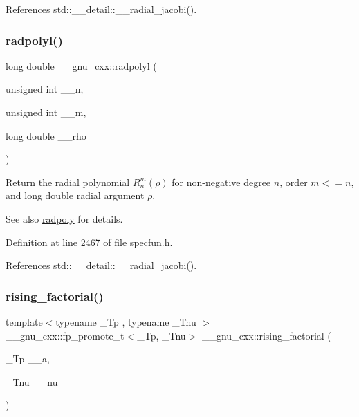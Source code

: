 References std\+::\+\_\+\+\_\+detail\+::\+\_\+\+\_\+radial\+\_\+jacobi().

\mbox{\label{group__gnu__math__spec__func_ga377febebd1096400897170bb7a76cd3a}} 
\subsubsection{\texorpdfstring{radpolyl()}{radpolyl()}}
{\footnotesize\ttfamily long double \+\_\+\+\_\+gnu\+\_\+cxx\+::radpolyl (\begin{DoxyParamCaption}\item[{unsigned int}]{\+\_\+\+\_\+n,  }\item[{unsigned int}]{\+\_\+\+\_\+m,  }\item[{long double}]{\+\_\+\+\_\+rho }\end{DoxyParamCaption})\hspace{0.3cm}{\ttfamily [inline]}}

Return the radial polynomial $ R_n^m(\rho) $ for non-\/negative degree $ n $, order $ m <= n $, and {\ttfamily long double} radial argument $ \rho $.

\begin{DoxySeeAlso}{See also}
\hyperlink{group__gnu__math__spec__func_ga195db2592888b7a8df870d9eaeff8d05}{radpoly} for details. 
\end{DoxySeeAlso}


Definition at line 2467 of file specfun.\+h.



References std\+::\+\_\+\+\_\+detail\+::\+\_\+\+\_\+radial\+\_\+jacobi().

\mbox{\label{group__gnu__math__spec__func_gae8c36a0e1f60254cf212a3806f7c675c}} 
\subsubsection{\texorpdfstring{rising\+\_\+factorial()}{rising\_factorial()}}
{\footnotesize\ttfamily template$<$typename \+\_\+\+Tp , typename \+\_\+\+Tnu $>$ \\
\+\_\+\+\_\+gnu\+\_\+cxx\+::fp\+\_\+promote\+\_\+t$<$\+\_\+\+Tp, \+\_\+\+Tnu$>$ \+\_\+\+\_\+gnu\+\_\+cxx\+::rising\+\_\+factorial (\begin{DoxyParamCaption}\item[{\+\_\+\+Tp}]{\+\_\+\+\_\+a,  }\item[{\+\_\+\+Tnu}]{\+\_\+\+\_\+nu }\end{DoxyParamCaption})\hspace{0.3cm}{\ttfamily [inline]}}



